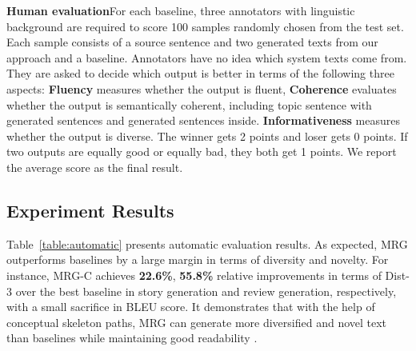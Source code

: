 \documentclass[letterpaper]{article} %
\begin{document}
\medskip\noindent\textbf{Human evaluation}\hspace{1em}For each baseline, three annotators with linguistic background are required to score 100 samples randomly chosen from the test set. Each sample consists of a source sentence and two generated texts from our approach and a baseline. Annotators have no idea which system texts come from. They are asked to decide which output is better in terms of the following three aspects: \textbf{Fluency} measures whether the output is fluent, \textbf{Coherence} evaluates whether the output is semantically coherent, including topic sentence with generated sentences and generated sentences inside. \textbf{Informativeness} measures whether the output is diverse. The winner gets 2 points and loser gets 0 points. If two outputs are equally good or equally bad, they both get 1 points. 
We report the average score as the final result. 
\subsection{Experiment Results}
Table~\ref{table:automatic} presents automatic evaluation results.
As expected, MRG outperforms  baselines by a large margin in terms of diversity and novelty. For instance, MRG-C achieves \textbf{22.6\%}, \textbf{55.8\%} relative improvements in terms of Dist-3
over the best baseline in story generation and review generation, respectively, with a small sacrifice in BLEU score. It demonstrates that with the help of  conceptual skeleton paths,
MRG can generate more diversified and novel text than baselines while maintaining good readability .
\end{document}
